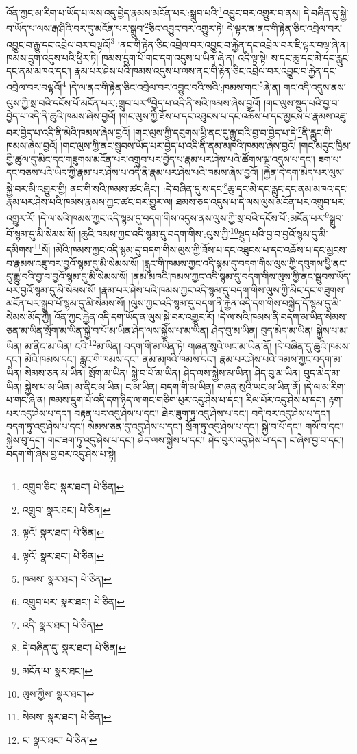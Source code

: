 འོན་ཀྱང་མ་རིག་པ་ཡོད་པ་ལས་འདུ་བྱེད་རྣམས་མངོན་པར་:སྒྲུབ་པའི་\footnote{འགྲུབ་ཅིང་  སྣར་ཐང་།  པེ་ཅིན། }འབྱུང་བར་འགྱུར་བ་ནས། དེ་བཞིན་དུ་སྐྱེ་བ་ཡོད་པ་ལས་རྒ་ཤིའི་བར་དུ་མངོན་པར་སྒྲུབ་\footnote{འགྲུབ་  སྣར་ཐང་།  པེ་ཅིན། }ཅིང་འབྱུང་བར་འགྱུར་ཏེ། དེ་ལྟར་ན་ནང་གི་རྟེན་ཅིང་འབྲེལ་བར་འབྱུང་བ་རྒྱུ་དང་འབྲེལ་བར་བལྟའོ།\footnote{ལྟའོ།  སྣར་ཐང་།  པེ་ཅིན། } །ནང་གི་རྟེན་ཅིང་འབྲེལ་བར་འབྱུང་བ་རྐྱེན་དང་འབྲེལ་བར་ཇི་ལྟར་བལྟ་ཞེ་ན། ཁམས་དྲུག་འདུས་པའི་ཕྱིར་ཏེ། ཁམས་དྲུག་པོ་གང་དག་འདུས་པ་ཡིན་ཞེ་ན། འདི་ལྟ་སྟེ། ས་དང་ཆུ་དང་མེ་དང་རླུང་དང་ནམ་མཁའ་དང་། རྣམ་པར་ཤེས་པའི་ཁམས་འདུས་པ་ལས་ནང་གི་རྟེན་ཅིང་འབྲེལ་བར་འབྱུང་བ་རྐྱེན་དང་འབྲེལ་བར་བལྟའོ།\footnote{ལྟའོ།  སྣར་ཐང་།  པེ་ཅིན། } །དེ་ལ་ནང་གི་རྟེན་ཅིང་འབྲེལ་བར་འབྱུང་བའི་སའི་:ཁམས་གང་\footnote{ཁམས་  སྣར་ཐང་།  པེ་ཅིན། }ཞེ་ན། གང་འདི་འདུས་ནས་ལུས་ཀྱི་སྲ་བའི་དངོས་པོ་མངོན་པར་:གྲུབ་པར་\footnote{འགྲུབ་པར་  སྣར་ཐང་།  པེ་ཅིན། }བྱེད་པ་འདི་ནི་སའི་ཁམས་ཞེས་བྱའོ། །གང་ལུས་སྡུད་པའི་བྱ་བ་བྱེད་པ་འདི་ནི་ཆུའི་ཁམས་ཞེས་བྱའོ། །གང་ལུས་ཀྱི་ཟོས་པ་དང་འཐུངས་པ་དང་འཆོས་པ་དང་མྱངས་པ་རྣམས་འཇུ་བར་བྱེད་པ་འདི་ནི་མེའི་ཁམས་ཞེས་བྱའོ། །གང་ལུས་ཀྱི་དབུགས་ཕྱི་ནང་དུ་རྒྱུ་བའི་བྱ་བ་བྱེད་པ་དེ་\footnote{འདི་  སྣར་ཐང་།  པེ་ཅིན། }ནི་རླུང་གི་ཁམས་ཞེས་བྱའོ། །གང་ལུས་ཀྱི་ནང་སྦུབས་ཡོད་པར་བྱེད་པ་འདི་ནི་ནམ་མཁའི་ཁམས་ཞེས་བྱའོ། །གང་མདུང་ཁྱིམ་གྱི་ཚུལ་དུ་མིང་དང་གཟུགས་མངོན་པར་འགྲུབ་པར་བྱེད་པ་རྣམ་པར་ཤེས་པའི་ཚོགས་ལྔ་འདུས་པ་དང་། ཟག་པ་དང་བཅས་པའི་ཡིད་ཀྱི་རྣམ་པར་ཤེས་པ་འདི་ནི་རྣམ་པར་ཤེས་པའི་ཁམས་ཞེས་བྱའོ། །རྐྱེན་དེ་དག་མེད་པར་ལུས་སྐྱེ་བར་མི་འགྱུར་གྱི། ནང་གི་སའི་ཁམས་ཚང་ཞིང་། :དེ་བཞིན་དུ་ས་དང་\footnote{དེ་བཞིན་དུ་  སྣར་ཐང་།  པེ་ཅིན། }ཆུ་དང་མེ་དང་རླུང་དང་ནམ་མཁའ་དང་རྣམ་པར་ཤེས་པའི་ཁམས་རྣམས་ཀྱང་ཚང་བར་གྱུར་ལ། ཐམས་ཅད་འདུས་པ་དེ་ལས་ལུས་མངོན་པར་འགྲུབ་པར་འགྱུར་རོ། །དེ་ལ་སའི་ཁམས་ཀྱང་འདི་སྙམ་དུ་བདག་གིས་འདུས་ནས་ལུས་ཀྱི་སྲ་བའི་དངོས་པོ་:མངོན་པར་\footnote{མངོན་པ་  སྣར་ཐང་། }སྒྲུབ་བོ་སྙམ་དུ་མི་སེམས་སོ། །ཆུའི་ཁམས་ཀྱང་འདི་སྙམ་དུ་བདག་གིས་:ལུས་ཀྱི་\footnote{ལུས་ཀྱིས་  སྣར་ཐང་། }སྡུད་པའི་བྱ་བ་བྱའོ་སྙམ་དུ་མི་དམིགས་\footnote{སེམས་  སྣར་ཐང་།  པེ་ཅིན། }སོ། །མེའི་ཁམས་ཀྱང་འདི་སྙམ་དུ་བདག་གིས་ལུས་ཀྱི་ཟོས་པ་དང་འཐུངས་པ་དང་འཆོས་པ་དང་མྱངས་བ་རྣམས་འཇུ་བར་བྱའོ་སྙམ་དུ་མི་སེམས་སོ། །རླུང་གི་ཁམས་ཀྱང་འདི་སྙམ་དུ་བདག་གིས་ལུས་ཀྱི་དབུགས་ཕྱི་ནང་དུ་རྒྱུ་བའི་བྱ་བ་བྱའོ་སྙམ་དུ་མི་སེམས་སོ། །ནམ་མཁའི་ཁམས་ཀྱང་འདི་སྙམ་དུ་བདག་གིས་ལུས་ཀྱི་ནང་སྦུབས་ཡོད་པར་བྱའོ་སྙམ་དུ་མི་སེམས་སོ། །རྣམ་པར་ཤེས་པའི་ཁམས་ཀྱང་འདི་སྙམ་དུ་བདག་གིས་ལུས་ཀྱི་མིང་དང་གཟུགས་མངོན་པར་སྒྲུབ་པོ་སྙམ་དུ་མི་སེམས་སོ། །ལུས་ཀྱང་འདི་སྙམ་དུ་བདག་ནི་རྐྱེན་འདི་དག་གིས་བསྐྱེད་དོ་སྙམ་དུ་མི་སེམས་མོད་ཀྱི། འོན་ཀྱང་རྐྱེན་འདི་དག་ཡོད་ན་ལུས་སྐྱེ་བར་འགྱུར་རོ། །དེ་ལ་སའི་ཁམས་ནི་བདག་མ་ཡིན་སེམས་ཅན་མ་ཡིན་སྲོག་མ་ཡིན་སྐྱེ་བ་པོ་མ་ཡིན་ཤེད་ལས་སྐྱེས་པ་མ་ཡིན། ཤེད་བུ་མ་ཡིན། བུད་མེད་མ་ཡིན། སྐྱེས་པ་མ་ཡིན། མ་ནིང་མ་ཡིན། ངའི་\footnote{ང་  སྣར་ཐང་།  པེ་ཅིན། }མ་ཡིན། བདག་གི་མ་ཡིན་ཏེ། གཞན་སུའི་ཡང་མ་ཡིན་ནོ། །དེ་བཞིན་དུ་ཆུའི་ཁམས་དང་། མེའི་ཁམས་དང་། རླུང་གི་ཁམས་དང་། ནམ་མཁའི་ཁམས་དང་། རྣམ་པར་ཤེས་པའི་ཁམས་ཀྱང་བདག་མ་ཡིན། སེམས་ཅན་མ་ཡིན། སྲོག་མ་ཡིན། སྐྱེ་བ་པོ་མ་ཡིན། ཤེད་ལས་སྐྱེས་མ་ཡིན། ཤེད་བུ་མ་ཡིན། བུད་མེད་མ་ཡིན། སྐྱེས་པ་མ་ཡིན། མ་ནིང་མ་ཡིན། ང་མ་ཡིན། བདག་གི་མ་ཡིན། གཞན་སུའི་ཡང་མ་ཡིན་ནོ། །དེ་ལ་མ་རིག་པ་གང་ཞེ་ན། ཁམས་དྲུག་པོ་འདི་དག་ཉིད་ལ་གང་གཅིག་པུར་འདུ་ཤེས་པ་དང་། རིལ་པོར་འདུ་ཤེས་པ་དང་། རྟག་པར་འདུ་ཤེས་པ་དང་། བརྟན་པར་འདུ་ཤེས་པ་དང་། ཐེར་ཟུག་ཏུ་འདུ་ཤེས་པ་དང་། བདེ་བར་འདུ་ཤེས་པ་དང་། བདག་ཏུ་འདུ་ཤེས་པ་དང་། སེམས་ཅན་དུ་འདུ་ཤེས་པ་དང་། སྲོག་ཏུ་འདུ་ཤེས་པ་དང་། སྐྱེ་བ་པོ་དང་། གསོ་བ་དང་། སྐྱེས་བུ་དང་། གང་ཟག་ཏུ་འདུ་ཤེས་པ་དང་། ཤེད་ལས་སྐྱེས་པ་དང་། ཤེད་བུར་འདུ་ཤེས་པ་དང་། ང་ཞེས་བྱ་བ་དང་། བདག་གོ་ཞེས་བྱ་བར་འདུ་ཤེས་པ་སྟེ། 